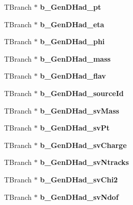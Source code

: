 \begin{DoxyCompactItemize}
T\+Branch $\ast$ {\bfseries b\+\_\+\+Gen\+D\+Had\+\_\+pt}
\item 
\hypertarget{classMiniTree_af8a1258c14e0cbd50f91124d47ad51a0}{}\label{classMiniTree_af8a1258c14e0cbd50f91124d47ad51a0} 
T\+Branch $\ast$ {\bfseries b\+\_\+\+Gen\+D\+Had\+\_\+eta}
\item 
\hypertarget{classMiniTree_aaa694bf820ba5d42e4baab639586dc71}{}\label{classMiniTree_aaa694bf820ba5d42e4baab639586dc71} 
T\+Branch $\ast$ {\bfseries b\+\_\+\+Gen\+D\+Had\+\_\+phi}
\item 
\hypertarget{classMiniTree_a01c41898875b123b6f9a20d215641b8c}{}\label{classMiniTree_a01c41898875b123b6f9a20d215641b8c} 
T\+Branch $\ast$ {\bfseries b\+\_\+\+Gen\+D\+Had\+\_\+mass}
\item 
\hypertarget{classMiniTree_ad1ad134f88305fec31579ed6814b2c13}{}\label{classMiniTree_ad1ad134f88305fec31579ed6814b2c13} 
T\+Branch $\ast$ {\bfseries b\+\_\+\+Gen\+D\+Had\+\_\+flav}
\item 
\hypertarget{classMiniTree_aa9ba34174a6e50f4da7cfa29de3912fa}{}\label{classMiniTree_aa9ba34174a6e50f4da7cfa29de3912fa} 
T\+Branch $\ast$ {\bfseries b\+\_\+\+Gen\+D\+Had\+\_\+source\+Id}
\item 
\hypertarget{classMiniTree_afe4040e4be6a3e145a62f6a3e5524909}{}\label{classMiniTree_afe4040e4be6a3e145a62f6a3e5524909} 
T\+Branch $\ast$ {\bfseries b\+\_\+\+Gen\+D\+Had\+\_\+sv\+Mass}
\item 
\hypertarget{classMiniTree_a6e2f9d2238682bcd60d378c1c8eacf6d}{}\label{classMiniTree_a6e2f9d2238682bcd60d378c1c8eacf6d} 
T\+Branch $\ast$ {\bfseries b\+\_\+\+Gen\+D\+Had\+\_\+sv\+Pt}
\item 
\hypertarget{classMiniTree_a268e3d54eea03ed72da01d41806c14c5}{}\label{classMiniTree_a268e3d54eea03ed72da01d41806c14c5} 
T\+Branch $\ast$ {\bfseries b\+\_\+\+Gen\+D\+Had\+\_\+sv\+Charge}
\item 
\hypertarget{classMiniTree_ac698d822db619e785f0fabd8742e42eb}{}\label{classMiniTree_ac698d822db619e785f0fabd8742e42eb} 
T\+Branch $\ast$ {\bfseries b\+\_\+\+Gen\+D\+Had\+\_\+sv\+Ntracks}
\item 
\hypertarget{classMiniTree_a66211df1e83843e26a628dd4992f7599}{}\label{classMiniTree_a66211df1e83843e26a628dd4992f7599} 
T\+Branch $\ast$ {\bfseries b\+\_\+\+Gen\+D\+Had\+\_\+sv\+Chi2}
\item 
\hypertarget{classMiniTree_a8ae140695ed96efb2ee46e286bd53df8}{}\label{classMiniTree_a8ae140695ed96efb2ee46e286bd53df8} 
T\+Branch $\ast$ {\bfseries b\+\_\+\+Gen\+D\+Had\+\_\+sv\+Ndof}
\item 

\end{DoxyCompactItemize}
